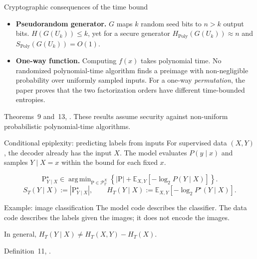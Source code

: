 \documentclass[aspectratio=169,notheorems]{beamer}
\theoremstyle{definition}
\newcommand{\E}{\mathbb{E}}
\newcommand{\Poly}{\mathrm{Poly}}
\newcommand{\prog}{\mathrm{P}}
\DeclareMathOperator*{\argmin}{arg\,min}
\newcommand{\src}[1]{{\scriptsize\color{black!60}#1\par}}
\begin{document}
\begin{frame}{Cryptographic consequences of the time bound}
\small
\begin{itemize}\setlength{\itemsep}{0.65em}
\item \textbf{Pseudorandom generator.} $G$ maps $k$ random seed bits to $n>k$ output bits.
      $H(G(U_k))\le k$, yet for a secure generator $H_{\Poly}(G(U_k))\approx n$ and $S_{\Poly}(G(U_k))=O(1)$.
\item \textbf{One-way function.} Computing $f(x)$ takes polynomial time. No randomized polynomial-time algorithm finds a preimage with non-negligible probability over uniformly sampled inputs.
      For a one-way \emph{permutation}, the paper proves that the two factorization orders have different time-bounded entropies.
\end{itemize}

\medskip
\src{Theorems~9 and~13, \citet{finzi2026}. These results assume security against non-uniform probabilistic polynomial-time algorithms.}
\end{frame}
\begin{frame}{Conditional epiplexity: predicting labels from inputs}
\small
For supervised data $(X,Y)$, the decoder already has the input $X$.
The model evaluates $P(y\mid x)$ and samples $Y\mid X=x$ within the bound for each fixed $x$.

\[
\prog^\star_{Y\mid X}\in\argmin_{\prog\in\mathcal P_T^X}
\left\{|\prog|+\E_{X,Y}[-\log_2 P(Y\mid X)]\right\}.
\]
\[
S_T(Y\mid X):=|\prog^\star_{Y\mid X}|,\qquad
H_T(Y\mid X):=\E_{X,Y}[-\log_2 P^\star(Y\mid X)].
\]
\begin{block}{Example: image classification}
The model code describes the classifier. The data code describes the labels given the images; it does not encode the images.
\end{block}
In general,
$H_T(Y\mid X)\ne H_T(X,Y)-H_T(X)$.

\medskip
\src{Definition~11, \citet{finzi2026}.}
\end{frame}
\end{document}
